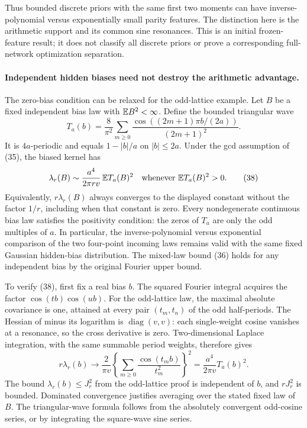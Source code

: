 Thus bounded discrete priors with the same first two moments can have
inverse-polynomial versus exponentially small parity features.
The distinction here is the arithmetic support and its common sine
resonances. This is an initial frozen-feature result; it does not classify
all discrete priors or prove a corresponding full-network optimization
separation.

\paragraph{Independent hidden biases need not destroy the arithmetic advantage.}
The zero-bias condition can be relaxed for the odd-lattice example. Let $B$
be a fixed independent bias law with $\mathbb E B^2<\infty$. Define the bounded triangular wave
\[
 T_a(b)=\frac8{\pi^2}\sum_{m\ge0}
       \frac{\cos((2m+1)\pi b/(2a))}{(2m+1)^2}.
\]
It is $4a$-periodic and equals $1-|b|/a$ on $|b|\le2a$.
Under the gcd assumption of (35), the biased kernel has
\[
 \lambda_r(B)\sim\frac{a^4}{2\pi r v}\,\mathbb E T_a(B)^2
 \quad\text{whenever }\mathbb E T_a(B)^2>0.                 \tag{38}
\]
Equivalently, $r\lambda_r(B)$ always converges to the displayed constant
without the factor $1/r$, including when that constant is zero.
Every nondegenerate continuous bias law satisfies the positivity condition:
the zeros of $T_a$ are only the odd multiples of $a$.
In particular, the inverse-polynomial versus exponential comparison of the
two four-point incoming laws remains valid with the same fixed Gaussian
hidden-bias distribution. The mixed-law bound (36) holds for any independent
bias by the original Fourier upper bound.

To verify (38), first fix a real bias $b$. The squared Fourier integral
acquires the factor $\cos(tb)\cos(ub)$. For the odd-lattice law, the
maximal absolute covariance is one, attained at every pair
$(t_m,t_n)$ of the odd half-periods. The Hessian of minus its logarithm
is $\operatorname{diag}(v,v)$: each single-weight cosine vanishes at a
resonance, so the cross derivative is zero. Two-dimensional Laplace
integration, with the same summable period weights, therefore gives
\[
 r\lambda_r(b)\longrightarrow
 \frac2{\pi v}\left\{\sum_{m\ge0}
                          \frac{\cos(t_mb)}{t_m^2}\right\}^2
              =\frac{a^4}{2\pi v}T_a(b)^2.
\]
The bound $\lambda_r(b)\le J_r^2$ from the odd-lattice proof is
independent of $b$, and $rJ_r^2$ is bounded. Dominated convergence
justifies averaging over the stated fixed law of $B$.
The triangular-wave formula follows from the absolutely convergent
odd-cosine series, or by integrating the square-wave sine series.

